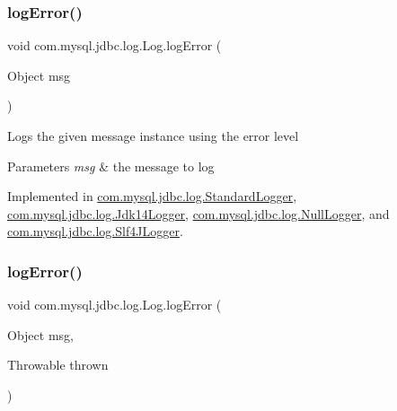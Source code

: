 \mbox{\label{interfacecom_1_1mysql_1_1jdbc_1_1log_1_1_log_aefe78baa37affef138eaba105b699022}} 
\subsubsection{\texorpdfstring{log\+Error()}{logError()}\hspace{0.1cm}{\footnotesize\ttfamily [1/2]}}
{\footnotesize\ttfamily void com.\+mysql.\+jdbc.\+log.\+Log.\+log\+Error (\begin{DoxyParamCaption}\item[{Object}]{msg }\end{DoxyParamCaption})}

Logs the given message instance using the \textquotesingle{}error\textquotesingle{} level


\begin{DoxyParams}{Parameters}
{\em msg} & the message to log \\
\hline
\end{DoxyParams}


Implemented in \mbox{\hyperlink{classcom_1_1mysql_1_1jdbc_1_1log_1_1_standard_logger_a8028fd5f19c7fce7b4568fbbe357d857}{com.\+mysql.\+jdbc.\+log.\+Standard\+Logger}}, \mbox{\hyperlink{classcom_1_1mysql_1_1jdbc_1_1log_1_1_jdk14_logger_ac1c3bf70b677a9fb3a47415201d6fead}{com.\+mysql.\+jdbc.\+log.\+Jdk14\+Logger}}, \mbox{\hyperlink{classcom_1_1mysql_1_1jdbc_1_1log_1_1_null_logger_a971d9823090761b63e867cf7950d0840}{com.\+mysql.\+jdbc.\+log.\+Null\+Logger}}, and \mbox{\hyperlink{classcom_1_1mysql_1_1jdbc_1_1log_1_1_slf4_j_logger_a3f95d26aa1dfc7988d06649979541ef1}{com.\+mysql.\+jdbc.\+log.\+Slf4\+J\+Logger}}.

\mbox{\label{interfacecom_1_1mysql_1_1jdbc_1_1log_1_1_log_abca2e1258e8b1bca83fd13066e8930cd}} 
\subsubsection{\texorpdfstring{log\+Error()}{logError()}\hspace{0.1cm}{\footnotesize\ttfamily [2/2]}}
{\footnotesize\ttfamily void com.\+mysql.\+jdbc.\+log.\+Log.\+log\+Error (\begin{DoxyParamCaption}\item[{Object}]{msg,  }\item[{Throwable}]{thrown }\end{DoxyParamCaption})}

